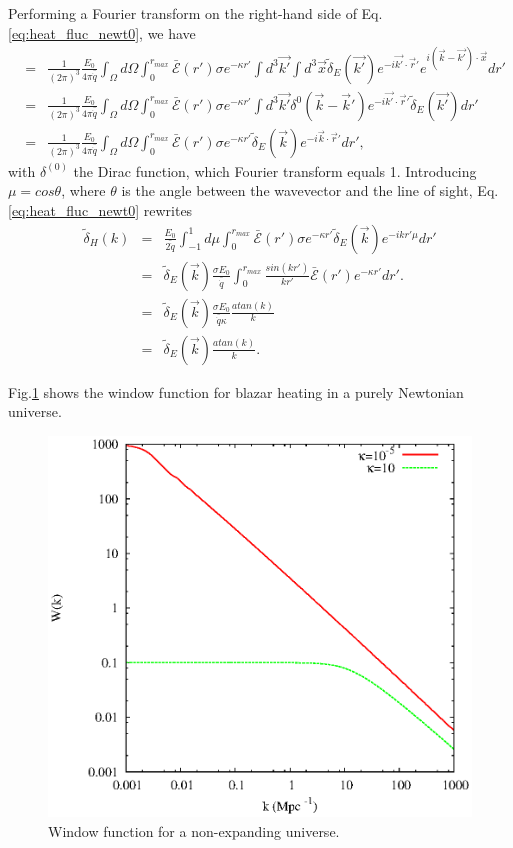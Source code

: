 \documentclass[twocolumns]{emulateapj}
\begin{document}
Performing a Fourier transform on the right-hand side of Eq.\ref{eq:heat_fluc_newt0}, we have
\begin{eqnarray}
  \label{eq:right}
  &=& \frac{1}{(2\pi)^3} \frac{E_0}{4\pi\bar{\dot{q}}}\int_{\Omega}d\Omega\int_0^{r_{max}} \bar{ \mathcal{E}}(r')\sigma  e^{-\kappa r'} \int d^3\vec{k'}\int d^3\vec{x} \tilde{\delta}_E(\vec{k'})e^{-i\vec{k'}\cdot{\vec{r}'}} e^{i(\vec{k}-\vec{k'})\cdot\vec{x}}  dr'\\ \nonumber
  &=&\frac{1}{(2\pi)^3} \frac{E_0}{4\pi\bar{\dot{q}}} \int_{\Omega}d\Omega\int_0^{r_{max}}   \bar{\mathcal{E}}(r')\sigma  e^{-\kappa r'} \int d^3\vec{k'} \delta^{0}(\vec{k}-\vec{k}')e^{-i\vec{k'}\cdot{\vec{r}'}} \tilde{\delta}_E(\vec{k'})    dr'\\ \nonumber
  &=&\frac{1}{(2\pi)^3} \frac{E_0}{4\pi\bar{\dot{q}}} \int_{\Omega}d\Omega\int_0^{r_{max}}  \bar{ \mathcal{E}}(r')\sigma  e^{-\kappa r'}  \tilde{\delta}_E(\vec{k}) e^{-i\vec{k}\cdot{\vec{r}'}}  dr',\label{eq:right_3}
\end{eqnarray}
with $\delta^{(0)}$ the Dirac function, which Fourier transform equals 1. Introducing $\mu=cos\theta$, where $\theta$ is the angle between the wavevector and the line of sight, Eq. \ref{eq:heat_fluc_newt0} rewrites
\begin{eqnarray}
  \label{eq:heat_fluc_newt1}
  \tilde{\delta}_H(k)&=&  \frac{E_0}{\bar{2\dot{q}}} \int_{-1}^{1} d\mu \int_0^{r_{max}}  \bar{\mathcal{E}}(r')\sigma  e^{-\kappa r'}  \tilde{\delta}_E(\vec{k}) e^{-ikr'\mu}  dr'\\
&=&\tilde{\delta}_E(\vec{k})\frac{\sigma E_0}{\bar{\dot{q}}}\int_0^{r_{max}} \frac{sin(kr')}{kr'}   \bar{\mathcal{E}}(r')  e^{-\kappa r'}   dr'.\\
&=&\tilde{\delta}_E(\vec{k})\frac{\sigma E_0}{ \bar{\dot{q}}\kappa}  \frac{atan(k)}{k}\\
&=&\tilde{\delta}_E(\vec{k}) \frac{atan(k)}{k}.
\end{eqnarray}

Fig.\ref{fig:window_newt} shows the window function for blazar heating in a purely Newtonian universe.

\begin{figure}[h]
  \centering
  \includegraphics[width = .45\textwidth ]{newtonian_window}
  \caption{Window function for a non-expanding universe.}
  \label{fig:window_newt}
\end{figure}
\end{document}
